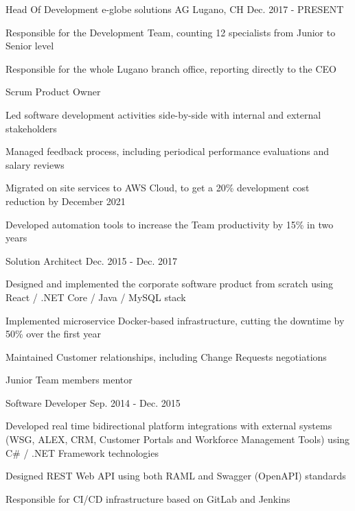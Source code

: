 
\begin{cventries}
  \cventry
    {Head Of Development} %
    {e-globe solutions AG} %
    {Lugano, CH} %
    {Dec. 2017 - PRESENT} %
    {
      \begin{cvitems} %
      	\item{Responsible for the Development Team, counting 12 specialists from Junior to Senior level}
      	\item{Responsible for the whole Lugano branch office, reporting directly to the CEO}
        \item {Scrum Product Owner}
        \item {Led software development activities side-by-side with internal and external stakeholders}
        \item {Managed feedback process, including periodical performance evaluations and salary reviews}
        \item {Migrated on site services to AWS Cloud, to get a 20\% development cost reduction by December 2021}
        \item {Developed automation tools to increase the Team productivity by 15\% in two years}
      \end{cvitems}
    }

  \cventry
    {Solution Architect} %
    {} %
    {} %
    {Dec. 2015 - Dec. 2017} %
    {
      \begin{cvitems} %
        \item {Designed and implemented the corporate software product from scratch using React / .NET Core / Java / MySQL stack}
        \item {Implemented microservice Docker-based infrastructure, cutting the downtime by 50\% over the first year}
        \item {Maintained Customer relationships, including Change Requests negotiations}
        \item {Junior Team members mentor}
      \end{cvitems}
    }

  \cventry
    {Software Developer} %
    {} %
    {} %
    {Sep. 2014 - Dec. 2015} %
    {
      \begin{cvitems} %
        \item {Developed real time bidirectional platform integrations with external systems (WSG, ALEX, CRM, Customer Portals and Workforce Management Tools) using C\# / .NET Framework technologies}
        \item {Designed REST Web API using both RAML and Swagger (OpenAPI) standards}
        \item {Responsible for CI/CD infrastructure based on GitLab and Jenkins}
      \end{cvitems}
    }


\end{cventries}
